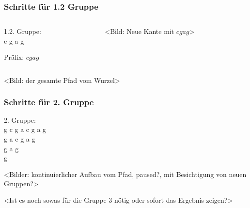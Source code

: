 \documentclass{beamer}
\begin{document}

\begin{frame}[t]
\frametitle{Schritte für 1.2 Gruppe}

    \begin{columns}

        \begin{column}[t]{0.5\textwidth}

            1.2. Gruppe:    \\
            c g a g         \\

            \medskip

            Präfix: $c g a g$

        \end{column}

        \begin{column}[t]{0.5\textwidth}
            
            <Bild: Neue Kante mit $c g a g $>

        \end{column}

    \end{columns}

    \bigskip

    <Bild: der gesamte Pfad vom Wurzel>

\end{frame}


\begin{frame}[t]
\frametitle{Schritte für 2. Gruppe}

    2. Gruppe:          \\
    g c g a c g a g     \\
    g a c g a g         \\
    g a g               \\
    g                   \\

\bigskip

<Bilder: kontinuierlicher Aufbau vom Pfad, paused?, mit Besichtigung von neuen Gruppen?>

\bigskip

<Ist es noch sowas für die Gruppe 3 nötig oder sofort das Ergebnis zeigen?>

\end{frame}
\end{document}
